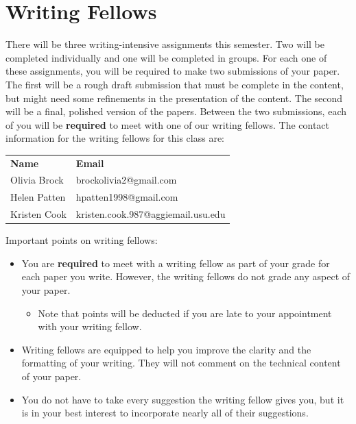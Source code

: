 \documentclass[12pt]{notes}
\begin{document}

\section{Writing Fellows}
There will be three writing-intensive assignments this semester. Two will be completed individually and one will be completed in groups. For each one of these assignments, you will be required to make two submissions of your paper. The first will be a rough draft submission that must be complete in the content, but might need some refinements in the presentation of the content. The second will be a final, polished version of the papers. Between the two submissions, each of you will be \textbf{required} to meet with one of our writing fellows. The contact information for the writing fellows for this class are:

\vspace{.5cm}
\def\arraystretch{1.5}%
\begin{tabular}{ll}
\textbf{Name} & \textbf{Email} \\
Olivia Brock & brockolivia2@gmail.com \\
Helen Patten & hpatten1998@gmail.com \\
Kristen Cook & kristen.cook.987@aggiemail.usu.edu \\
\end{tabular}

\nspace
Important points on writing fellows:
\begin{itemize}
\item You are \textbf{required} to meet with a writing fellow as part of your grade for each paper you write. However, the writing fellows do not grade any aspect of your paper. 
\begin{itemize}
\item Note that points will be deducted if you are late to your appointment with your writing fellow. 
\end{itemize}
\item Writing fellows are equipped to help you improve the clarity and the formatting of your writing. They will not comment on the technical content of your paper. 
\item You do not have to take every suggestion the writing fellow gives you, but it is in your best interest to incorporate nearly all of their suggestions. 
\end{itemize}
\end{document}

